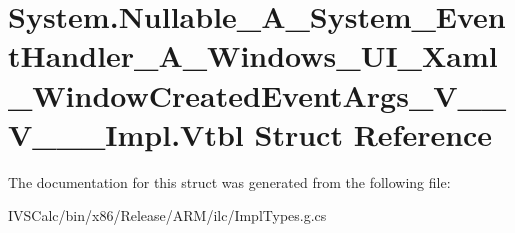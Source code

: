 \hypertarget{struct_system_1_1_nullable___a___system___event_handler___a___windows___u_i___xaml___window_creae3b8e090b219c7b62990397e06cb2c3c}{}\section{System.\+Nullable\+\_\+\+A\+\_\+\+System\+\_\+\+Event\+Handler\+\_\+\+A\+\_\+\+Windows\+\_\+\+U\+I\+\_\+\+Xaml\+\_\+\+Window\+Created\+Event\+Args\+\_\+\+V\+\_\+\+\_\+\+V\+\_\+\+\_\+\+\_\+\+Impl.\+Vtbl Struct Reference}
\label{struct_system_1_1_nullable___a___system___event_handler___a___windows___u_i___xaml___window_creae3b8e090b219c7b62990397e06cb2c3c}


The documentation for this struct was generated from the following file\+:\begin{DoxyCompactItemize}
\item 
I\+V\+S\+Calc/bin/x86/\+Release/\+A\+R\+M/ilc/Impl\+Types.\+g.\+cs\end{DoxyCompactItemize}
